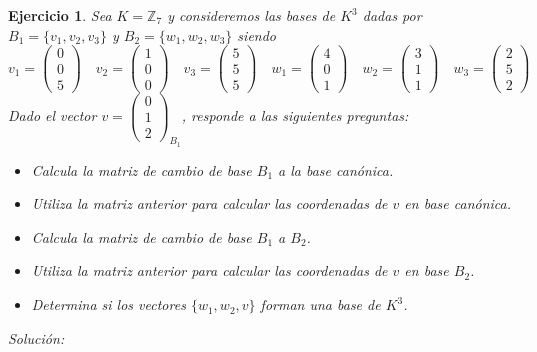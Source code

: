 \documentclass{amsart}
\newtheorem{ejer}{Ejercicio}
\begin{document}
\begin{ejer}
Sea $K = {\mathbb Z}_{7}$ y consideremos las bases de $K^3$ dadas por
$ B_1 = \{v_1,v_2,v_3\}$ y $B_2 = \{w_1,w_2,w_3\}$
siendo 
$$
v_1 = \left(\begin{array}{r}
0 \\
0 \\
5
\end{array}\right) \quad 
v_2 = \left(\begin{array}{r}
1 \\
0 \\
0
\end{array}\right) \quad
v_3 = \left(\begin{array}{r}
5 \\
5 \\
5
\end{array}\right)
\quad
w_1 = \left(\begin{array}{r}
4 \\
0 \\
1
\end{array}\right) \quad
w_2 = \left(\begin{array}{r}
3 \\
1 \\
1
\end{array}\right) \quad
w_3 = \left(\begin{array}{r}
2 \\
5 \\
2
\end{array}\right)
$$
Dado el vector $v = \left(\begin{array}{r}
0 \\
1 \\
2
\end{array}\right)_{B_1}$, responde a las siguientes preguntas:
\begin{itemize}
\item Calcula la matriz de cambio de base $B_1$ a la base canónica.
\item Utiliza la matriz anterior para calcular las coordenadas de
$v$ en base canónica.
\item Calcula la matriz de cambio de base $B_1$ a $B_2$.
\item Utiliza la matriz anterior para calcular las coordenadas de
$v$ en base $B_2$.
\item Determina si los vectores $\{w_1,w_2,v\}$ forman una base
de $K^3$.
\end{itemize}
\end{ejer}

{\it Solución: }
\end{document}
